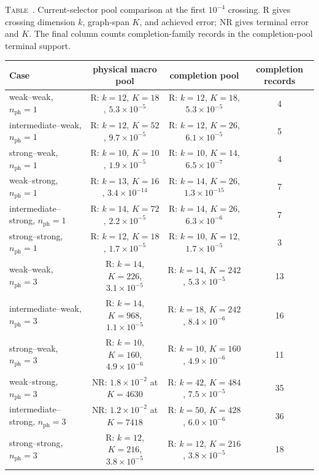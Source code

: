\documentclass[
  reprint,
  amsmath,
  amssymb,
  aps,
  pra,
  nofootinbib,
  superscriptaddress,
  floatfix
]{revtex4-2}
\newcommand{\nph}{n_{\mathrm{ph}}}
\newcommand{\inlinetablecaption}[2]{%
  \refstepcounter{table}\label{#1}%
  \noindent\textsc{Table~\thetable.} #2\par\vspace{0.6ex}%
}
\begin{document}
\begin{widetext}
\inlinetablecaption{tab:pool_ablation_full}{Current-selector pool comparison at
the first $10^{-4}$ crossing.  R gives crossing dimension $k$, graph-span
$K$, and achieved error; NR gives terminal error and $K$.  The final column
counts completion-family records in the completion-pool terminal support.}
\begin{center}
\scriptsize
\begin{tabular*}{\textwidth}{@{\extracolsep{\fill}}lccc@{}}
\toprule
Case & physical macro pool & completion pool & completion records \\
\midrule
weak--weak, $\nph=1$ & R: $k=12$, $K=18$, $5.3\times10^{-5}$ & R: $k=12$, $K=18$, $5.3\times10^{-5}$ & 4 \\
intermediate--weak, $\nph=1$ & R: $k=12$, $K=52$, $9.7\times10^{-5}$ & R: $k=12$, $K=26$, $6.1\times10^{-5}$ & 5 \\
strong--weak, $\nph=1$ & R: $k=10$, $K=10$, $1.9\times10^{-5}$ & R: $k=10$, $K=14$, $6.5\times10^{-7}$ & 4 \\
weak--strong, $\nph=1$ & R: $k=13$, $K=16$, $3.4\times10^{-14}$ & R: $k=14$, $K=26$, $1.3\times10^{-15}$ & 7 \\
intermediate--strong, $\nph=1$ & R: $k=14$, $K=72$, $2.2\times10^{-5}$ & R: $k=14$, $K=26$, $6.3\times10^{-6}$ & 7 \\
strong--strong, $\nph=1$ & R: $k=12$, $K=18$, $1.7\times10^{-5}$ & R: $k=10$, $K=12$, $1.7\times10^{-5}$ & 3 \\
weak--weak, $\nph=3$ & R: $k=14$, $K=226$, $3.1\times10^{-5}$ & R: $k=14$, $K=242$, $5.3\times10^{-5}$ & 13 \\
intermediate--weak, $\nph=3$ & R: $k=14$, $K=968$, $1.1\times10^{-5}$ & R: $k=18$, $K=242$, $8.4\times10^{-6}$ & 16 \\
strong--weak, $\nph=3$ & R: $k=10$, $K=160$, $4.9\times10^{-6}$ & R: $k=10$, $K=160$, $4.9\times10^{-6}$ & 11 \\
weak--strong, $\nph=3$ & NR: $1.8\times10^{-2}$ at $K=4630$ & R: $k=42$, $K=484$, $7.5\times10^{-5}$ & 35 \\
intermediate--strong, $\nph=3$ & NR: $1.2\times10^{-2}$ at $K=7418$ & R: $k=50$, $K=428$, $6.0\times10^{-6}$ & 36 \\
strong--strong, $\nph=3$ & R: $k=12$, $K=216$, $3.8\times10^{-5}$ & R: $k=12$, $K=216$, $3.8\times10^{-5}$ & 18 \\
\bottomrule
\end{tabular*}
\end{center}
\end{widetext}
\end{document}
